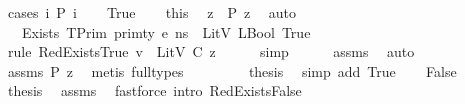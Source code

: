 \begin{isabellebody}
%
\isadelimproof
%
\endisadelimproof
%
\isatagproof
{}\isamarkupfalse%
\ {\isacharparenleft}{\kern0pt}cases\ {\isachardoublequoteopen}{\isasymexists}i{\isachardot}{\kern0pt}\ P\ i{\isachardoublequoteclose}{\isacharparenright}{\kern0pt}\isanewline
\ \ \isamarkupfalse%
\ True\isanewline
\ \ \isamarkupfalse%
\ this\ \isamarkupfalse%
\ z\ \ {\isachardoublequoteopen}P\ z{\isachardoublequoteclose}\ \isamarkupfalse%
\ auto\isanewline
\ \ \isamarkupfalse%
\ {\isachardoublequoteopen}{\isasymLambda}{\isacharcomma}{\kern0pt}{\isasymGamma}{\isacharcomma}{\kern0pt}{\isasymOmega}\ {\isasymturnstile}\ {\isasymlangle}Exists\ {\isacharparenleft}{\kern0pt}TPrim\ primty{\isacharparenright}{\kern0pt}\ e{\isacharcomma}{\kern0pt}\ ns{\isasymrangle}\ {\isasymDown}\ LitV\ {\isacharparenleft}{\kern0pt}LBool\ True{\isacharparenright}{\kern0pt}{\isachardoublequoteclose}\isanewline
\ \ \ \ \isamarkupfalse%
\ {\isacharparenleft}{\kern0pt}rule\ RedExistsTrue{\isacharbrackleft}{\kern0pt}\ {\isacharquery}{\kern0pt}v\ {\isacharequal}{\kern0pt}\ {\isachardoublequoteopen}LitV\ {\isacharparenleft}{\kern0pt}C\ z{\isacharparenright}{\kern0pt}{\isachardoublequoteclose}{\isacharbrackright}{\kern0pt}{\isacharparenright}{\kern0pt}\isanewline
\ \ \ \ \isamarkupfalse%
\ simp\isanewline
\ \ \ \ \isamarkupfalse%
\ assms{\isacharparenleft}{\kern0pt}{}{\isacharparenright}{\kern0pt}\ \isamarkupfalse%
\ auto{\isacharbrackleft}{\kern0pt}{}{\isacharbrackright}{\kern0pt}\isanewline
\ \ \ \ \isamarkupfalse%
\ assms\ {\isacartoucheopen}P\ z{\isacartoucheclose}\ \isamarkupfalse%
\ {\isacharparenleft}{\kern0pt}metis\ {\isacharparenleft}{\kern0pt}full{\isacharunderscore}{\kern0pt}types{\isacharparenright}{\kern0pt}{\isacharparenright}{\kern0pt}\ \ \ \ \ \isanewline
\ \ \isamarkupfalse%
\ {\isacharquery}{\kern0pt}thesis\ \isamarkupfalse%
\ {\isacharparenleft}{\kern0pt}simp\ add{\isacharcolon}{\kern0pt}\ True{\isacharparenright}{\kern0pt}\isanewline
{}\isamarkupfalse%
\isanewline
\ \ \isamarkupfalse%
\ False\isanewline
\ \ \isamarkupfalse%
\ {\isacharquery}{\kern0pt}thesis\ \isamarkupfalse%
\ assms\ \isamarkupfalse%
\ {\isacharparenleft}{\kern0pt}fastforce\ intro{\isacharcolon}{\kern0pt}\ RedExistsFalse{\isacharparenright}{\kern0pt}\isanewline

\end{isabellebody}
